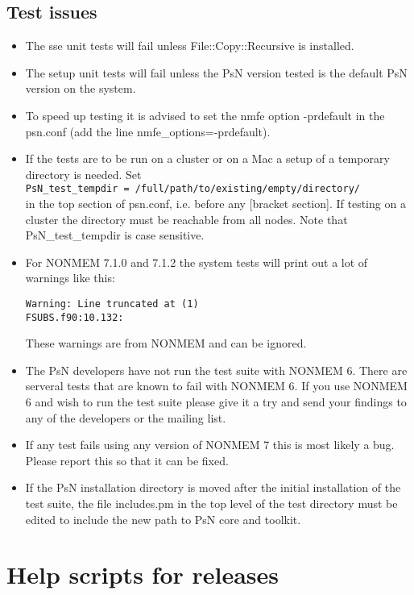 \subsection{Test issues}
\begin{itemize}
    \item The sse unit tests will fail unless File::Copy::Recursive is installed.
    \item The setup unit tests will fail unless the PsN version tested is the default PsN version on the system.
	\item To speed up testing it is advised to set the nmfe option -prdefault in the psn.conf (add the line nmfe\_options=-prdefault).
	\item If the tests are to be run on a cluster or on a Mac a setup of a temporary directory is needed. Set\\
    \verb|PsN_test_tempdir = /full/path/to/existing/empty/directory/| \\
    in the top section of psn.conf, i.e. before any [bracket section].
     If testing on a cluster the directory must be reachable from all nodes.
     Note that PsN\_test\_tempdir is case sensitive.
	\item For NONMEM 7.1.0 and 7.1.2 the system tests will print out a lot of warnings like this:
\begin{verbatim}
Warning: Line truncated at (1)
FSUBS.f90:10.132:
\end{verbatim}
These warnings are from NONMEM and can be ignored.
	\item	The PsN developers have not run the test suite with NONMEM 6. There are serveral tests that are known to fail with NONMEM 6. If you use NONMEM 6 and wish to run the test suite please give it a try and send your findings to any of the developers or the mailing list.
	\item If any test fails using any version of NONMEM 7 this is most likely a bug. Please report this so that it can be fixed.
    \item If the PsN installation directory is moved after the initial installation of the test suite, the file includes.pm in the top level of the test directory
    must be edited to include the new path to PsN core and toolkit.
\end{itemize}

\section{Help scripts for releases}

